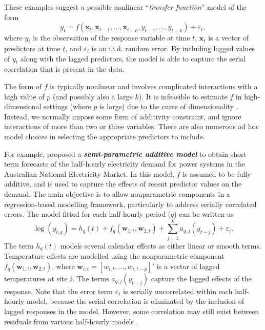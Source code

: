 \documentclass[
  11pt,
  a4paper,
]{article}
\begin{document}
These examples suggest a possible nonlinear ``\emph{transfer function}''
model of the form \[
 y_t = f(\bm{x}_{t}, \bm{x}_{t-1}, \dots,\bm{x}_{t-p}, y_{t-1},\dots,y_{t-k}) + \varepsilon_{t},
\] where \(y_{t}\) is the observation of the response variable at time
\(t\), \(\bm{x}_{t}\) is a vector of predictors at time \(t\), and
\(\varepsilon_{t}\) is an i.i.d. random error. By including lagged
values of \(y_{t}\) along with the lagged predictors, the model is able
to capture the serial correlation that is present in the data.

The form of \(f\) is typically nonlinear and involves complicated
interactions with a high value of \(p\) (and possibly also a large
\(k\)). It is infeasible to estimate \(f\) in high-dimensional settings
(where \(p\) is large) due to the curse of dimensionality
\autocite{Bellman57,Stone82}. Instead, we normally impose some form of
additivity constraint, and ignore interactions of more than two or three
variables. There are also numerous ad hoc model choices in selecting the
appropriate predictors to include.

For example, \textcite{FH2012} proposed a \textbf{\emph{semi-parametric
additive model}} to obtain short-term forecasts of the half-hourly
electricity demand for power systems in the Australian National
Electricity Market. In this model, \(f\) is assumed to be fully
additive, and is used to capture the effects of recent predictor values
on the demand. The main objective is to allow nonparametric components
in a regression-based modelling framework, particularly to address
serially correlated errors. The model fitted for each half-hourly period
(\(q\)) can be written as \[
 \log(y_{t,q}) = h_{q}(t) + f_{q}(\bm{w}_{1,t},\bm{w}_{2,t}) + \sum_{j=1}^k a_{q,j}(y_{t-j}) + \varepsilon_{t}.
\] The term \(h_{q}(t)\) models several calendar effects as either
linear or smooth terms. Temperature effects are modelled using the
nonparametric component \(f_{q}(\bm{w}_{1,t},\bm{w}_{2,t})\), where
\(\bm{w}_{i,t} = [w_{i,t},\dots,w_{i,t-p}]'\) is a vector of lagged
temperatures at site \(i\). The terms \(a_{q,j}(y_{t-j})\) capture the
lagged effects of the response. Note that the error term
\(\varepsilon_{t}\) is serially uncorrelated within each half-hourly
model, because the serial correlation is eliminated by the inclusion of
lagged responses in the model. However, some correlation may still exist
between residuals from various half-hourly models \autocite{FH2012}.
\end{document}
